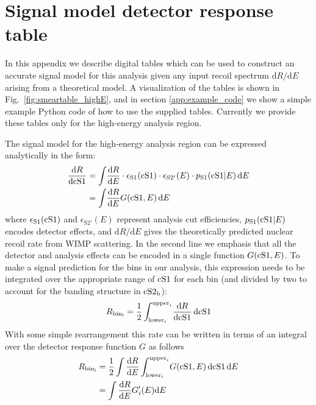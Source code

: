 
\section{Signal model detector response table}
\label{app:response_table}

In this appendix we describe digital tables which can be used to construct an accurate signal model for this analysis given any input recoil spectrum $\mathrm{d}R/\mathrm{d}E$ arising from a theoretical model. A visualization of the tables is shown in Fig.~\ref{fig:smeartable_highE}, and in section \ref{app:example_code} we show a simple example Python code of how to use the supplied tables. Currently we provide these tables only for the high-energy analysis region.

The signal model for the high-energy analysis region can be expressed analytically in the form:
%
\begin{align}
\label{eq:high2D}
  \frac{\mathrm{d} R}{\mathrm{d}\mathrm{cS1}} &= \int \! \frac{\mathrm{d}R}{\mathrm{d}E} \cdot \epsilon_\mathrm{S1}(\mathrm{cS1}) \cdot \epsilon_\mathrm{S2'}(E) \cdot p_\mathrm{S1}(\mathrm{\mathrm{cS1}}|E) \, \mathrm{d}E \\
  &= \int \! \frac{\mathrm{d}R}{\mathrm{d}E} G(\mathrm{cS1},E) \, \mathrm{d}E
\end{align}
%
where $\epsilon_\mathrm{S1}(\mathrm{cS1})$ and $\epsilon_\mathrm{S2'}(E)$ represent analysis cut efficiencies, $p_\mathrm{S1}(\mathrm{\mathrm{cS1}}|E)$ encodes detector effects, and $\mathrm{d}R/\mathrm{d}E$ gives the theoretically predicted nuclear recoil rate from WIMP scattering. In the second line we emphasis that all the detector and analysis effects can be encoded in a single function $G(\mathrm{cS1},E)$. To make a signal prediction for the bins in our analysis, this expression needs to be integrated over the appropriate range of $\mathrm{cS1}$ for each bin (and divided by two to account for the banding structure in $\mathrm{cS2}_\mathrm{b}$):
%
\begin{equation}
  R_\mathrm{bin_i} = \frac{1}{2}\int_{\mathrm{lower}_i}^{\mathrm{upper}_i} \! \frac{\mathrm{d} R}{\mathrm{d}\mathrm{cS1}} \, \mathrm{d}\mathrm{cS1}
\end{equation}
%
With some simple rearrangement this rate can be written in terms of an integral over the detector response function $G$ as follows
%
\begin{align}
  R_\mathrm{bin_i} &= \frac{1}{2}\int\frac{\mathrm{d} R}{\mathrm{d}E}\int_{\mathrm{lower}_i}^{\mathrm{upper}_i} \! G(\mathrm{cS1},E) \, \mathrm{d}\mathrm{cS1} \, \mathrm{d}E \\
 &= \int\frac{\mathrm{d} R}{\mathrm{d}E} G'_i(E) \mathrm{d}E
\end{align}
